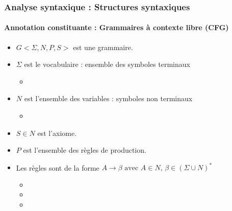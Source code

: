 \documentclass[xcolor=table]{beamer}
\begin{document}
\begin{frame}
\frametitle{Analyse syntaxique : Structures syntaxiques}
\framesubtitle{Annotation constituante : Grammaires à contexte libre (CFG)}

\begin{minipage}{.68\textwidth}
\begin{itemize}
	\item $G <\Sigma, N, P, S>$ est une grammaire.
	\item $\Sigma$ est le vocabulaire : ensemble des symboles terminaux
	\begin{itemize}
		\item {}
	\end{itemize}
	\item $N$ est l'ensemble des  variables : symboles non terminaux 
	\begin{itemize}
		\item {}
	\end{itemize}
\end{itemize}
\end{minipage}
\begin{minipage}{.3\textwidth}
\end{minipage}

\begin{itemize}
	\item $S \in N$ est l'axiome.
	\item $P$ est l'ensemble des règles de production.
	\item Les règles sont de la forme $A \rightarrow \beta \text{ avec } A \in N,\, \beta \in (\Sigma \cup N)^*$
	\begin{itemize}
		\item {}
		\item {}
		\item {}
	\end{itemize}
\end{itemize}

\end{frame}
\end{document}
